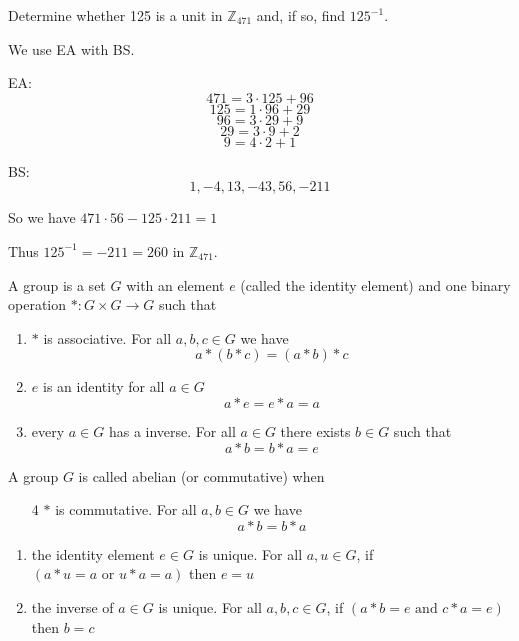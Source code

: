 
\begin{exmp}
Determine whether 125 is a unit in $\mathbb{Z}_{471}$ and, if so, find $125^{-1}$.
\end{exmp}

\begin{solution}
We use EA with BS.

EA:
\[471 = 3\cdot 125 + 96\]
\[125 = 1\cdot 96 + 29\]
\[96 = 3\cdot 29 + 9\]
\[29 = 3\cdot 9 + 2\]
\[9 = 4\cdot 2 + 1\]

BS:
\[1,-4,13,-43,56,-211\]

So we have $471\cdot 56 - 125\cdot 211 = 1$

Thus $125^{-1} = -211 = 260$ in $\mathbb{Z}_{471}$.
\end{solution}

\begin{defn}[Group]
A group is a set $G$ with an element $e$ (called the identity element) and one binary operation $\ast \colon G\times G\to G$ such that 

\begin{enumerate}
\item $\ast$ is associative. For all $a,b,c\in G$ we have \[a\ast (b\ast c) = (a\ast b)\ast c\]
\item $e$ is an identity for all $a\in G$ \[a\ast e = e\ast a = a\]
\item every $a\in G$ has a inverse. For all $a\in G$ there exists $b\in G$ such that \[a\ast b = b\ast a = e\]
\end{enumerate}
\end{defn}

\begin{defn}
A group $G$ is called abelian (or commutative) when
\begin{enumerate}
\item[4] $\ast$ is commutative. For all $a,b\in G$ we have \[a\ast b = b\ast a\]
\end{enumerate}
\end{defn}

\begin{note}\leavevmode

\begin{enumerate}
\item the identity element $e\in G$ is unique. For all $a,u\in G$, if $(a\ast u = a \text{ or } u\ast a = a)$ then $e = u$
\item the inverse of $a\in G$ is unique. For all $a,b,c\in G$, if $(a\ast b =e \text{ and } c\ast a = e)$ then $b=c$
\end{enumerate}
\end{note}

